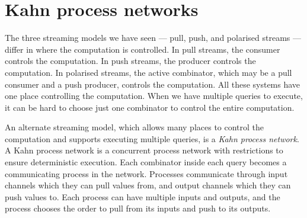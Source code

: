 \section{Kahn process networks}
\label{taxonomy/kpn}

The three streaming models we have seen --- pull, push, and polarised streams --- differ in where the computation is controlled.
In pull streams, the consumer controls the computation.
In push streams, the producer controls the computation.
In polarised streams, the active combinator, which may be a pull consumer and a push producer, controls the computation.
All these systems have one place controlling the computation.
When we have multiple queries to execute, it can be hard to choose just one combinator to control the entire computation.

An alternate streaming model, which allows many places to control the computation and supports executing multiple queries, is a \emph{Kahn process network}.
A Kahn process network is a concurrent process network with restrictions to ensure deterministic execution.
Each combinator inside each query becomes a communicating process in the network.
Processes communicate through input channels which they can pull values from, and output channels which they can push values to.
Each process can have multiple inputs and outputs, and the process chooses the order to pull from its inputs and push to its outputs.

